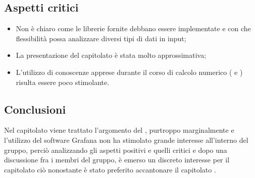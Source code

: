 \subsection{Aspetti critici}
\begin{itemize}
\item Non è chiaro come le librerie fornite debbano essere implementate e con che flessibilità possa analizzare diversi tipi di dati in input;
\item La presentazione del capitolato è stata molto approssimativa;
\item L'utilizzo di conoscenze apprese durante il corso di calcolo numerico ( e ) risulta essere poco stimolante.

\end{itemize}
\subsection{Conclusioni}
Nel capitolato viene trattato l'argomento del ,  purtroppo marginalmente e l'utilizzo del software Grafana non ha stimolato grande interesse all'interno del gruppo, perciò analizzando gli aspetti positivi e quelli critici e dopo una discussione fra i membri del gruppo, \`e emerso un discreto interesse per il capitolato ci\`o nonostante \`e stato preferito accantonare il capitolato .